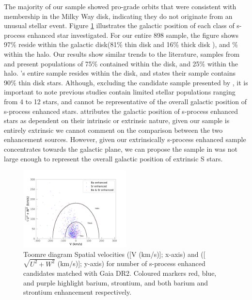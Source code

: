 \documentclass[a4paper,fleqn,usenatbib]{mnras}
\begin{document}
The majority of our sample showed pro-grade orbits that were consistent with membership in the Milky Way disk, indicating they do not originate from an unusual stellar event. Figure \ref{fig:figure4} illustrates the galactic position of each class of s-process enhanced star investigated. For our entire 898 sample, the figure shows 97\% reside within the galactic disk(81\% thin disk and 16\% thick disk ), and \% within the halo. Our results show similar trends to the literature, samples from \cite{gomez1997} and \cite{mennessier1997} present populations of 75\% contained within the disk, and 25\% within the halo. \cite{pereira2011}’s entire sample resides within the disk, and \cite{decastro2016} states their sample contains 90\% thin disk stars. Although, excluding the candidate sample presented by \cite{decastro2016}, it is important to note previous studies contain limited stellar populations ranging from 4 to 12 stars, and cannot be representative of the overall galactic position of s-process enhanced stars. \cite{jorissen1993} attributes the galactic position of s-process enhanced stars as dependent on their intrinsic or extrinsic nature, given our sample is entirely extrinsic we cannot comment on the comparison between the two enhancement sources. However, given our extrinsically s-process enhanced sample concentrates towards the galactic plane, we can propose the sample in \cite{jorissen1993} was not large enough to represent the overall galactic position of extrinsic S stars.

\begin{figure}
	\includegraphics[width=0.5\textwidth]{toomre.pdf}
	\caption{Toomre diagram Spatial velocities ([V (km/s)]; x-axis) and ([$\sqrt{U^2+W^2}$ (km/s)]; y-axis) for number of s-process enhanced candidates matched with Gaia DR2. Coloured markers red, blue, and purple highlight barium, strontium, and both barium and strontium enhancement respectively.}
	\label{fig:figure4}
\end{figure}
\end{document}

